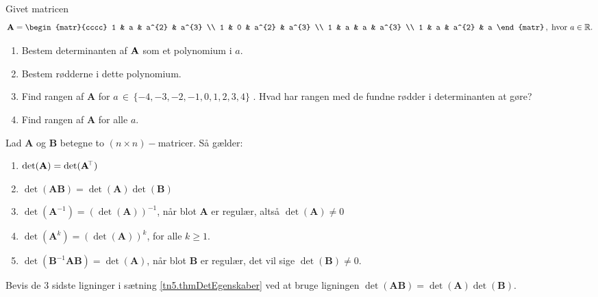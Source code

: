 \begin{exercise} \label{tn5.exercReduktionDet}
Givet matricen
\begin{equation}
\mathbf{A} = \begin{matr}{cccc}
1 & a & a^{2} & a^{3} \\
1 & 0 & a^{2} & a^{3} \\
1 & a & a & a^{3} \\
1 & a & a^{2} & a
\end{matr} \, , \; \textrm{hvor $a \in \Bbb R$.}
\end{equation}
\begin{enumerate}
\item Bestem determinanten af ${\bf{A}}$ som et polynomium i $a$.
\item Bestem rødderne i dette polynomium.
\item Find rangen af ${\mathbf{A}}$ for $a \, \in \,
\{-4, -3, -2, -1, 0, 1, 2, 3, 4\}$ . Hvad har rangen med de fundne
rødder i determinanten at gøre?
\item Find rangen af ${\mathbf{A}}$ for alle $a$.
\end{enumerate}
\end{exercise}

\begin{theorem} \label{tn5.thmDetEgenskaber}
Lad $\mathbf{A}$ og $\mathbf{B}$ betegne to $(n \times n)-$matricer. Så gælder:
\begin{enumerate}
\item $ \det(\mathbf{A}) = \det(\mathbf{A}\hspace*{-.6mm}^{\top}) $
\item $ \det(\mathbf{A}\mathbf{B}) = \det(\mathbf{A})\det(\mathbf{B}) $
\item $ \det(\mathbf{A}^{-1}) = \left(\det(\mathbf{A})\right)^{-1} $, når blot $\mathbf{A}$ er regulær, altså $\det(\mathbf{A}) \neq 0$
\item $ \det(\mathbf{A}^{k}) = (\det(\mathbf{A}))^{k} $, for alle $k \geq 1$.
\item $ \det(\mathbf{B}^{-1}\mathbf{A}\mathbf{B}) = \det(\mathbf{A}) $, når blot $\mathbf{B}$ er regulær, det vil sige $\det(\mathbf{B}) \neq 0$.
\end{enumerate}
\end{theorem}

\begin{exercise}
Bevis de $3$ sidste ligninger i sætning \ref{tn5.thmDetEgenskaber} ved at bruge ligningen $\det(\mathbf{A}\mathbf{B}) = \det(\mathbf{A})\det(\mathbf{B})$.
\end{exercise}


